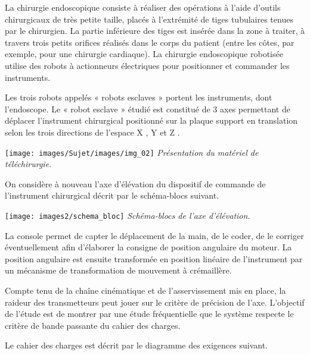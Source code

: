 \documentclass[10pt,fleqn]{article} %
\begin{document}
La chirurgie endoscopique consiste à réaliser des opérations à
l’aide d’outils chirurgicaux de très petite taille, placés à l’extrémité
de tiges tubulaires tenues par le chirurgien. La partie inférieure des
tiges est insérée dans la zone à traiter, à travers trois petits orifices
réalisés dans le corps du patient (entre les côtes, par exemple, pour
une chirurgie cardiaque).
La chirurgie endoscopique robotisée utilise des robots à actionneurs
électriques pour positionner et commander les instruments.

Les trois robots appelés « robots esclaves » portent les instruments,
dont l’endoscope.
Le « robot esclave » étudié est constitué de 3 axes permettant de déplacer l’instrument
chirurgical positionné sur la plaque support en translation selon les trois directions
de l’espace X , Y et Z .

\begin{center}%
	\texttt{[image: images/Sujet/images/img\_02]}
	\textit{Présentation du matériel de téléchirurgie.}
\end{center}

 On considère à nouveau l'axe d'élévation du dispositif de commande de l'instrument chirurgical décrit par le schéma-blocs suivant.

\begin{center}%
	\texttt{[image: images2/schema\_bloc]}
	\textit{Schéma-blocs de l'axe d'élévation.}
\end{center}

La console permet de capter le déplacement de la main, de le coder, de le corriger éventuellement afin d'élaborer la consigne de position angulaire du moteur. La position angulaire est ensuite transformée en position linéaire de l'instrument par un mécanisme de transformation de mouvement à crémaillère.

\begin{obj}
Compte tenu de la chaîne cinématique et de l'asservissement mis en place, la raideur des transmetteurs peut jouer sur le critère de précision de l'axe. L'objectif de l'étude est de montrer par une étude fréquentielle que le système respecte le critère de bande passante du cahier des charges.
\end{obj}

Le cahier des charges est décrit par le diagramme des exigences suivant.
\end{document}
